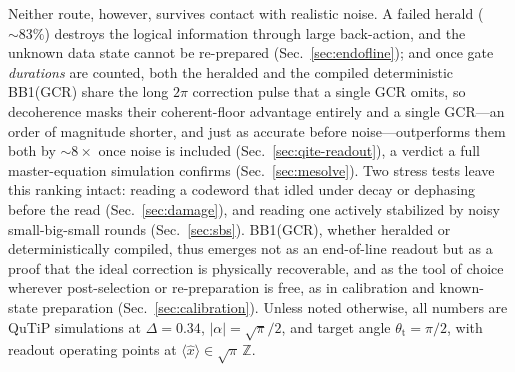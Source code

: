\documentclass[11pt]{article}
\begin{document}
Neither route, however, survives contact with realistic noise. A failed herald ($\sim\!83\%$)
destroys the logical information through large back-action, and the unknown data state cannot be
re-prepared (Sec.~\ref{sec:endofline}); and once gate \emph{durations} are counted, both the
heralded and the compiled deterministic BB1(GCR) share the long $2\pi$ correction pulse that a
single GCR omits, so decoherence masks their coherent-floor advantage entirely and a single
GCR---an order of magnitude shorter, and just as accurate before noise---outperforms them both by
$\sim\!8\times$ once noise is included (Sec.~\ref{sec:qite-readout}), a verdict a full
master-equation simulation confirms (Sec.~\ref{sec:mesolve}). Two stress tests leave this ranking
intact: reading a codeword that idled under decay or dephasing before the read
(Sec.~\ref{sec:damage}), and reading one actively stabilized by noisy small-big-small rounds
(Sec.~\ref{sec:sbs}). BB1(GCR), whether heralded or deterministically compiled, thus emerges not as
an end-of-line readout but as a proof that the ideal correction is physically recoverable, and as
the tool of choice wherever post-selection or re-preparation is free, as in calibration and
known-state preparation (Sec.~\ref{sec:calibration}). Unless noted otherwise, all numbers are QuTiP
simulations at $\Delta=0.34$, $|\alpha|=\sqrt{\pi}/2$, and target angle $\theta_\mathrm{t}=\pi/2$,
with readout operating points at $\langle\hat x\rangle\in\sqrt{\pi}\,\mathbb{Z}$.
\end{document}
